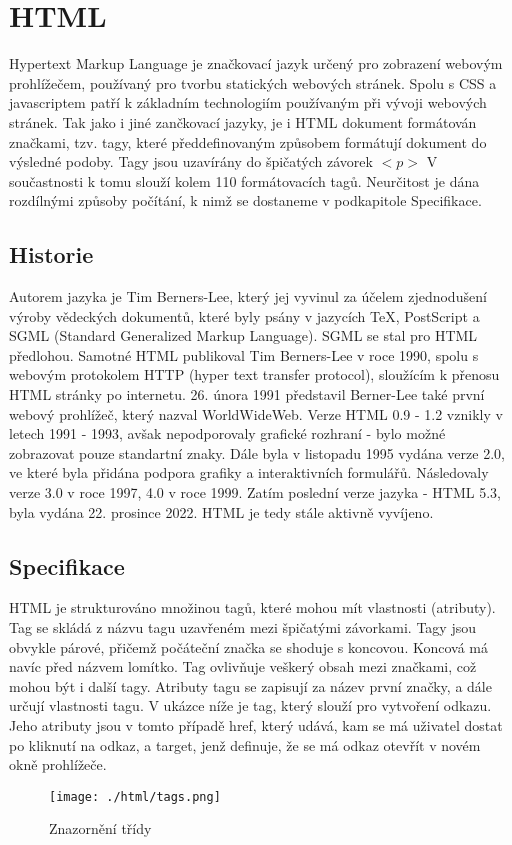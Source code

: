 \documentclass[main.tex]{subfiles}
\begin{document}
\section{HTML}
Hypertext Markup Language je značkovací jazyk určený pro zobrazení webovým prohlížečem, používaný pro tvorbu statických webových stránek. Spolu s CSS a javascriptem patří k základním technologiím používaným při vývoji webových stránek. Tak jako i jiné zančkovací jazyky, je i HTML dokument formátován značkami, tzv. tagy, které předdefinovaným způsobem formátují dokument do výsledné podoby. Tagy jsou uzavírány do špičatých závorek $<p>$ \cite{web:wik:en:html} V součastnosti k tomu slouží kolem 110 formátovacích tagů. Neurčitost je dána rozdílnými způsoby počítání, k nimž se dostaneme v podkapitole Specifikace. \cite{web:en:countinghtml}


\subsection{Historie}
Autorem jazyka je Tim Berners-Lee, který jej vyvinul za účelem zjednodušení výroby vědeckých dokumentů, které byly psány v jazycích TeX, PostScript a SGML (Standard Generalized Markup Language). SGML se stal pro HTML předlohou. Samotné HTML publikoval Tim Berners-Lee v roce 1990, spolu s webovým protokolem HTTP (hyper text transfer protocol), sloužícím k přenosu HTML stránky po internetu. 26. února 1991 představil Berner-Lee také první webový prohlížeč, který nazval WorldWideWeb.
Verze HTML 0.9 - 1.2 vznikly v letech 1991 - 1993, avšak nepodporovaly grafické rozhraní - bylo možné zobrazovat pouze standartní znaky. Dále byla v listopadu 1995 vydána verze 2.0, ve které byla přidána podpora grafiky a interaktivních formulářů. Následovaly verze 3.0 v roce 1997, 4.0 v roce 1999. Zatím poslední verze jazyka - HTML 5.3, byla vydána 22. prosince 2022. HTML je tedy stále aktivně vyvíjeno. \cite{web:wik:en:html}


\subsection{Specifikace}
HTML je strukturováno množinou tagů, které mohou mít vlastnosti (atributy). Tag se skládá z názvu tagu uzavřeném mezi špičatými závorkami. Tagy jsou obvykle párové, přičemž počáteční značka se shoduje s koncovou. Koncová má navíc před názvem lomítko. Tag ovlivňuje veškerý obsah mezi značkami, což mohou být i další tagy. Atributy tagu se zapisují za název první značky, a dále určují vlastnosti tagu. V ukázce níže je tag, který slouží pro vytvoření odkazu. Jeho atributy jsou v tomto případě href, který udává, kam se má uživatel dostat po kliknutí na odkaz, a target, jenž definuje, že se má odkaz otevřít v novém okně prohlížeče.\cite{web:wik:en:html}
		\begin{figure}[h]
			\centering
			\texttt{[image: ./html/tags.png]}
			\caption{Znazornění třídy}
		\end{figure}
\end{document}
